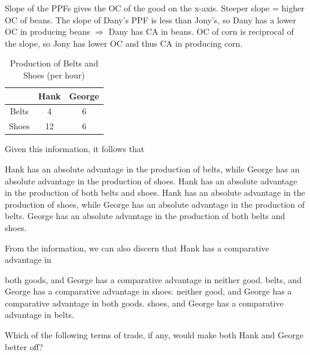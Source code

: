\documentclass[addpoints,11pt]{exam}
\theoremstyle{definition}
\begin{document}
\begin{questions}
			\begin{solution}
				Slope of the PPFs gives the OC of the good on the x-axis. Steeper slope = higher OC of beans. The slope of Dany's PPF is less than Jony's, so Dany has a lower OC in producing beans $\Rightarrow$ Dany has CA in beans. OC of corn is reciprocal of the slope, so Jony has lower OC and thus CA in producing corn.
			\end{solution}
			

\begin{table}[H]
	\caption{Production of Belts and Shoes (per hour)}
	\label{tab1}
	\centering
	\begin{tabular}{  c| c c} 
		
		& Hank & George \\
		\hline
		Belts & 4 & 6 \\
		Shoes & 12 & 6 \\
	\end{tabular}
\end{table}


\question \label{q8} Given this information, it follows that 

\begin{choices}
	\choice Hank has an absolute advantage in the production of belts, while George has an absolute advantage in the production of shoes.
	\choice Hank has an absolute advantage in the production of both belts and shoes.
	\CorrectChoice Hank has an absolute advantage in the production of shoes, while George has an absolute advantage in the production of belts.
	\choice George has an absolute advantage in the production of both belts and shoes.
\end{choices}

\question \label{q9} From the information, we can also discern that Hank has a comparative advantage in 

\begin{choices}
	\choice both goods, and George has a comparative advantage in neither good.
	\choice belts, and George has a comparative advantage in shoes.
	\choice neither good, and George has a comparative advantage in both goods.
	\CorrectChoice shoes, and George has a comparative advantage in belts.
\end{choices}


\question \label{q10} Which of the following terms of trade, if any, would make both Hank and George better off?


\end{questions}
\end{document}
